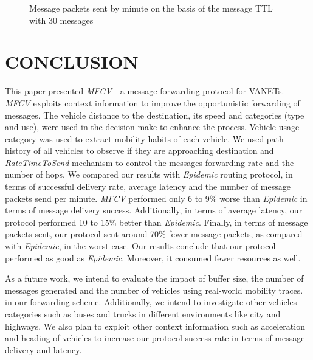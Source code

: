\documentclass[letterpaper, 10 pt, conference]{ieeeconf}  %
\begin{document}
\begin{figure}[thpb]
    \center
    \caption{Message packets sent by minute on the basis of the message TTL with 30 messages} \label{grafico4}
\end{figure}

\section{CONCLUSION}

This paper presented \emph{MFCV} - a message forwarding protocol for VANETs. \emph{MFCV} exploits context information to improve the opportunistic forwarding of messages. The vehicle distance to the destination, its speed and categories (type and use), were used in the decision make to enhance the process. Vehicle usage category was used to extract mobility habits of each vehicle. We used path history of all vehicles to observe if they are approaching destination and \emph{RateTimeToSend} mechanism to control the messages forwarding rate and the number of hops. We compared our results with \emph{Epidemic} routing protocol, in terms of successful delivery rate, average latency and the number of message packets send per minute. \emph{MFCV} performed only 6 to 9\% worse than \emph{Epidemic} in terms of message delivery success. Additionally, in terms of average latency, our protocol performed 10 to 15\% better than \emph{Epidemic}. Finally, in terms of message packets sent, our protocol sent around 70\% fewer message packets, as compared with \emph{Epidemic}, in the worst case. Our results conclude that our protocol performed as good as \emph{Epidemic}. Moreover, it consumed fewer resources as well.

As a future work, we intend to evaluate the impact of buffer size, the number of messages generated and the number of vehicles using real-world mobility traces. in our forwarding scheme. Additionally, we intend to investigate other vehicles categories such as buses and trucks in different environments like city and highways. We also plan to exploit other context information such as acceleration and heading of vehicles to increase our protocol success rate in terms of message delivery and latency.
\end{document}
